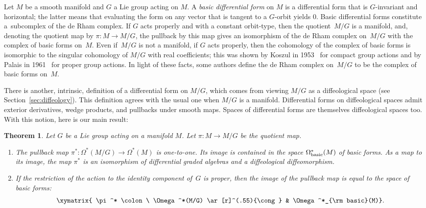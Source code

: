 \documentclass[pdftex]{sigma}
\numberwithin{equation}{section}
\newtheorem{Theorem}{Theorem}[section]
\begin{document}
Let $M$ be a smooth manifold and $G$ a Lie group acting on $M$.
A \emph{basic differential form} on $M$
is a dif\/ferential form that is $G$-invariant and horizontal;
the latter means that
evaluating the form on any vector that is tangent to a $G$-orbit yields $0$.
Basic dif\/ferential forms constitute a~subcomplex of the de Rham complex.
If $G$ acts properly and with a constant orbit-type, then the quotient~$M/G$ is a manifold,
and, denoting the quotient map by $\pi \colon M \to M/G$,
the pullback by this map
gives an isomorphism of the de Rham complex on~$M/G$
with the complex of basic forms on~$M$.
Even if~$M/G$ is not a manifold, if $G$ acts properly, then
the cohomology of the complex of basic forms
is isomorphic to the singular cohomology of $M/G$ with real coef\/f\/icients;
this was shown by Koszul in 1953~\cite{koszul} for compact group actions
and by Palais in 1961~\cite{palais} for proper group actions.
In light of these facts, some authors def\/ine the de Rham complex on~$M/G$
to be the complex of basic forms on~$M$.

There is another, intrinsic, def\/inition of a dif\/ferential form on $M/G$,
which comes from viewing $M/G$ as a dif\/feological space (see Section~\ref{sec:diffeology}). This def\/inition agrees with the usual one when $M/G$ is a manifold. Dif\/ferential forms on dif\/feological spaces
admit exterior derivatives,
wedge products, and pullbacks under smooth maps.
Spaces of dif\/ferential forms are themselves dif\/feological spaces too.
With this notion, here is our main result:

\begin{Theorem}\label{t:main}
Let $G$ be a Lie group acting on a manifold $M$.
Let $\pi\colon M\to M/G$ be the quotient map.
\begin{enumerate}\itemsep=0pt
\item[$(i)$] The pullback map $\pi^* \colon \Omega^*(M/G) \to \Omega^*(M)$
is one-to-one. Its image is contained in the space $\Omega^*_{\rm basic}(M)$
of basic forms. As a map to its image,
the map $\pi^*$ is an isomorphism of differential graded algebras
and a diffeological diffeomorphism.
\item[$(ii)$] If the restriction of the action to the identity component of~$G$
is proper, then the image of the pullback map is equal to the space
of basic forms:
\begin{gather*}\xymatrix{
\pi^* \colon \ \Omega^*(M/G) \ar[r]^(.55){\cong}
& \Omega^*_{\rm basic}(M)}.\end{gather*}
\end{enumerate}
\end{Theorem}
\end{document}
